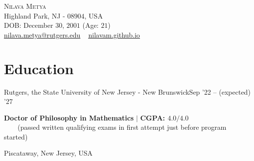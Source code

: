 
\usepackage{tabto}
\usepackage{setspace}
\usepackage{etaremune}
\usepackage{xcolor}
\newcommand*\circled[1]{\tikz[baseline=(char.base)]{
            \node[shape=circle,draw,inner sep=1pt, line width=1.1pt] (char) {#1};}}





\begin{center}
    {\Huge \scshape Nilava Metya} \\ \vspace{1pt}
    Highland Park, NJ - $08904$, USA\\
    DOB: December $30$, $2001$ (Age: $21$)\\ \vspace{1pt}
{\small 
\href{mailto:nilava.metya@rutgers.edu}{\circled{\scriptsize\faEnvelope}  \underline{nilava.metya@rutgers.edu}} ~ 
{\circled{\scriptsize\faHome} \underline{\url{nilavam.github.io}}}}
\end{center}



\section{Education}
\resumeSubheading
{Rutgers, the State University of New Jersey - New Brunswick}{Sep '22 -- (expected) '27}
{\begin{minipage}{15cm} \color{grey}\textbf{Doctor of Philosophy in Mathematics}  $|$ \textbf{CGPA: $4.0/4.0$}\\
$\phantom{\qquad}$(passed written qualifying exams in first attempt just before program started) \end{minipage}
}{Piscataway, New Jersey, USA}
\vspace{-5pt}

